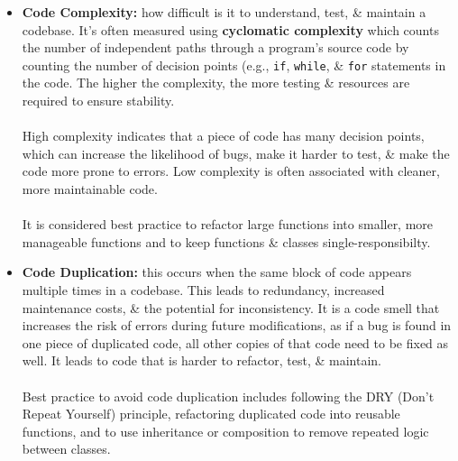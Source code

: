\documentclass[a4paper,11pt]{article}
\begin{document}
\begin{itemize}
    \item   \textbf{Code Complexity:} how difficult is it to understand, test, \& maintain a codebase.
            It's often measured using \textbf{cyclomatic complexity} which counts the number of independent paths through a program's source code by counting the number of decision points (e.g., \texttt{if}, \texttt{while}, \& \texttt{for} statements in the code.
            The higher the complexity, the more testing \& resources are required to ensure stability.
            \\\\
            High complexity indicates that a piece of code has many decision points, which can increase the likelihood of bugs, make it harder to test, \& make the code more prone to errors.
            Low complexity is often associated with cleaner, more maintainable code.
            \\\\
            It is considered best practice to refactor large functions into smaller, more manageable functions and to keep functions \& classes single-responsibilty.


    \item   \textbf{Code Duplication:} this occurs when the same block of code appears multiple times in a codebase.
            This leads to redundancy, increased maintenance costs, \& the potential for inconsistency.
            It is a code smell that increases the risk of errors during future modifications, as if a bug is found in one piece of duplicated code, all other copies of that code need to be fixed as well.
            It leads to code that is harder to refactor, test, \& maintain.
            \\\\
            Best practice to avoid code duplication includes following the DRY (Don't Repeat Yourself) principle, refactoring  duplicated code into reusable functions, and to use inheritance or composition to remove repeated logic between classes.



\end{itemize}
\end{document}
